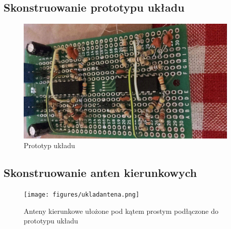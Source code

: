 \documentclass[12pt]{article}
\begin{document}
\subsection{Skonstruowanie prototypu układu}
\begin{figure}[H]
\begin{center}
\includegraphics[width=0.95\textwidth]{figures/plytka.png}
\caption{Prototyp układu}
\end{center}
\end{figure}

\subsection{Skonstruowanie anten kierunkowych}
\begin{figure}[H]
\begin{center}
\texttt{[image: figures/ukladantena.png]}
\caption{Anteny kierunkowe ułożone pod kątem prostym podłączone do prototypu układu}
\end{center}
\end{figure}
\end{document}

